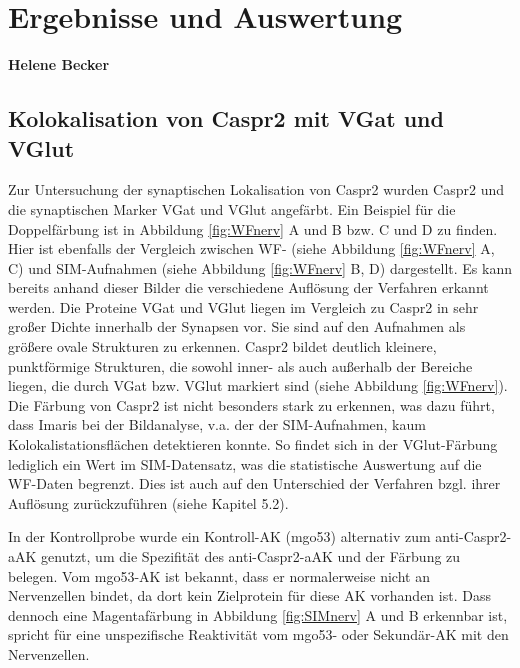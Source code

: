 \chapter{Ergebnisse und Auswertung}
\textbf{Helene Becker}
\section{Kolokalisation von Caspr2 mit VGat und VGlut}

Zur Untersuchung der synaptischen Lokalisation von Caspr2 wurden Caspr2 und die
synaptischen Marker VGat und VGlut angefärbt. Ein Beispiel für die Doppelfärbung ist in Abbildung \ref{fig:WFnerv} A und B bzw. C und D zu finden. Hier ist ebenfalls der Vergleich zwischen WF- (siehe Abbildung \ref{fig:WFnerv} A, C) und SIM-Aufnahmen (siehe Abbildung \ref{fig:WFnerv} B, D) dargestellt. Es kann bereits anhand dieser Bilder die verschiedene Auflösung der Verfahren erkannt werden. 
Die Proteine VGat und VGlut liegen im Vergleich zu Caspr2 in sehr großer Dichte innerhalb der Synapsen vor. Sie sind auf den Aufnahmen als größere ovale Strukturen zu erkennen. Caspr2 bildet deutlich kleinere, punktförmige Strukturen, die sowohl inner- als auch außerhalb der Bereiche liegen, die durch VGat bzw. VGlut markiert sind (siehe Abbildung \ref{fig:WFnerv}). Die Färbung von Caspr2 ist nicht besonders stark zu erkennen, was dazu führt, dass Imaris bei der Bildanalyse, v.a. der der SIM-Aufnahmen, kaum Kolokalistationsflächen detektieren konnte. So findet sich in der VGlut-Färbung lediglich ein Wert im SIM-Datensatz, was die statistische Auswertung auf die WF-Daten begrenzt. 
Dies ist auch auf den Unterschied der Verfahren bzgl. ihrer Auflösung zurückzuführen (siehe Kapitel 5.2). 

In der Kontrollprobe wurde ein Kontroll-AK (mgo53) alternativ zum anti-Caspr2-aAK genutzt, um die Spezifität des anti-Caspr2-aAK und der Färbung zu belegen. Vom mgo53-AK ist bekannt, dass er normalerweise nicht an Nervenzellen bindet, da dort kein Zielprotein für diese AK vorhanden ist. Dass dennoch eine Magentafärbung in Abbildung \ref{fig:SIMnerv} A und B erkennbar ist, spricht für eine unspezifische Reaktivität vom mgo53- oder Sekundär-AK mit den Nervenzellen. 

